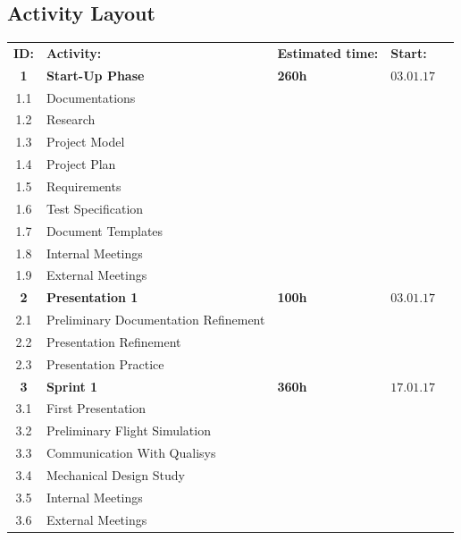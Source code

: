 \begin{center}
\centering\section*{\textbf{Activity Layout}}
\begin{tabular}{cllll}
\rowcolor{cadetgrey}
\textbf{ID:}    &\textbf{Activity:} 	 &\textbf{Estimated time:}    &\textbf{Start:}  \\ %
    
\textbf{1} & \textbf{Start-Up Phase} & \textbf{260h} & $03.01.17$ 
\\\rowcolor{gainsboro}
1.1       & Documentations     &     &  \\
1.2       & Research     &     &  \\\rowcolor{gainsboro}
1.3       & Project Model     &     & \\
1.4       & Project Plan     &     & 
\\\rowcolor{gainsboro}
1.5       & Requirements     &     & \\
1.6       & Test Specification     &     & 
\\\rowcolor{gainsboro}
1.7       & Document Templates     &    & \\
1.8       & Internal Meetings      &    & 
\\\rowcolor{gainsboro}
1.9       & External Meetings      &    & \\
\textbf{2} & \textbf{Presentation 1}     & \textbf{100h}    & $03.01.17$ 
\\\rowcolor{gainsboro}
2.1     & Preliminary Documentation Refinement  &    & \\
2.2     & Presentation Refinement  &    &
\\\rowcolor{gainsboro}
2.3     & Presentation Practice  &    & \\
\textbf{3} & \textbf{Sprint 1}     & \textbf{360h}     & $17.01.17$ 
\\\rowcolor{gainsboro}
3.1     & First Presentation &  & \\
3.2     & Preliminary Flight Simulation &  & 
\\\rowcolor{gainsboro}
3.3     & Communication With Qualisys &  & \\
3.4     & Mechanical Design Study &  & 
\\\rowcolor{gainsboro}
3.5       & Internal Meetings      &    & \\
3.6       & External Meetings      &    & 

\end{tabular}
\end{center}
